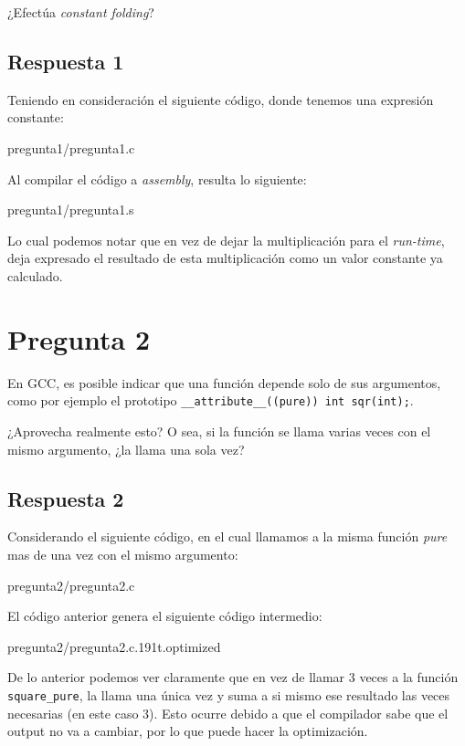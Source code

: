 \documentclass[spanish, fleqn]{article}
\begin{document}
¿Efectúa \textit{constant folding}?

\subsection{Respuesta 1}

Teniendo en consideración el siguiente código, donde tenemos una expresión constante:

 {pregunta1/pregunta1.c}

Al compilar el código a \textit{assembly}, resulta lo siguiente:

 {pregunta1/pregunta1.s}

Lo cual podemos notar que en vez de dejar la multiplicación para el \textit{run-time}, deja expresado el resultado de esta multiplicación como un valor constante ya calculado.

\section{Pregunta 2}

En GCC, es posible indicar que una función depende solo de sus argumentos,
como por ejemplo el prototipo
\texttt{\_\_attribute\_\_((pure)) int sqr(int);}.

¿Aprovecha realmente esto? O sea, si la función se llama varias veces con el mismo argumento, ¿la llama una sola vez?

\subsection{Respuesta 2}

Considerando el siguiente código, en el cual llamamos a la misma función \textit{pure} mas de una vez con el mismo argumento:

 {pregunta2/pregunta2.c}

El código anterior genera el siguiente código intermedio:

 {pregunta2/pregunta2.c.191t.optimized}

De lo anterior podemos ver claramente que en vez de llamar 3 veces a la función \texttt{square\_pure}, la llama una única vez y suma a si mismo ese resultado las veces necesarias (en este caso 3). Esto ocurre debido a que el compilador sabe que el output no va a cambiar, por lo que puede hacer la optimización.
\end{document}
